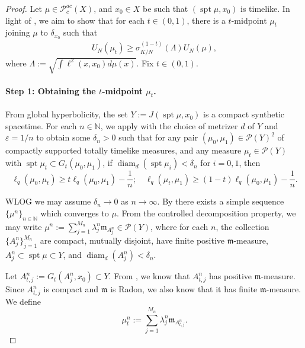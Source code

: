\documentclass[10pt,a4paper]{amsart}
\DeclareMathOperator{\diam}{diam}
\DeclareMathOperator{\spt}{spt}
\newcommand{\N}{\mathbb{N}}
\newcommand{\Pcal}{\mathcal{P}}
\newcommand{\m}{\mathfrak{m}}
\renewcommand{\epsilon}{\varepsilon}
\begin{document}
\begin{proof}
Let $\mu\in\Pcal_c^{ac}(X)$, and $x_0\in X$ be such that $(\spt\mu,x_0)$ is timelike. In light of , we aim to show that for each $t\in(0,1)$, there is a $t$-midpoint $\mu_t$ joining $\mu$ to $\delta_{x_0}$ such that 
\begin{align}\label{convexityinequality1}
U_N(\mu_t)\geq\sigma_{K/N}^{(1-t)}(\Lambda)U_N(\mu),
\end{align}
where $\Lambda:= \sqrt{\int \ell^2(x,x_0)d\mu(x)}$. Fix $t\in (0,1)$.


\paragraph{Step 1: Obtaining the $t$-midpoint $\mu_t$.}

From global hyperbolicity, the set $Y:=J(\spt\mu, x_0)$ is a compact synthetic spacetime. For each $n\in\N$, we apply  with the choice of metrizer $d$ of $Y$ and $\epsilon=1/n$ to obtain some $\delta_n>0$ such that for any pair $(\mu_0, \mu_1)\in \Pcal(Y)^2$ of compactly supported totally timelike measures, and any measure $\mu_t\in \Pcal(Y)$ with $\spt\mu_t\subset G_t(\mu_0, \mu_1)$,  if $\diam_d(\spt\mu_i)<\delta_n$ for $i=0,1$, then 
\[\ell_q(\mu_0, \mu_t) \geq t\ell_q(\mu_0, \mu_1)-\frac 1n; \quad \ell_q(\mu_t, \mu_1) \geq (1-t)\ell_q(\mu_0, \mu_1)-\frac1n.\]

WLOG we may assume $\delta_n\to 0$ as $n\to\infty$. By  there exists a simple sequence $\{\mu^n\}_{n\in\N}$ which converges to $\mu$. From the controlled decomposition property, we may write $\mu^n:=\sum_{j=1}^{M_n}\lambda_j^n \m_{A_j^n}\in \Pcal(Y)$, where for each $n$, the collection $\{A_j^n\}_{j=1}^{M_n}$ are compact, mutually disjoint, have finite positive $\m$-measure, $A_j^n\subset \spt\mu\subset Y$, and $\diam_d(A_j^n)<\delta_n$. 

Let $A_{t,j}^n:=G_t(A_j^n,x_0)\subset Y$. From , we know that $A_{t,j}^n$ has positive $\m$-measure. Since $A_{t,j}^n$ is compact and $\m$ is Radon, we also know that it has finite $\m$-measure. We define 
\[\mu_{t}^n:=\sum_{j=1}^{M_n}\lambda_j^n \m_{A_{t,j}^n}.\]


\end{proof}
\end{document}
